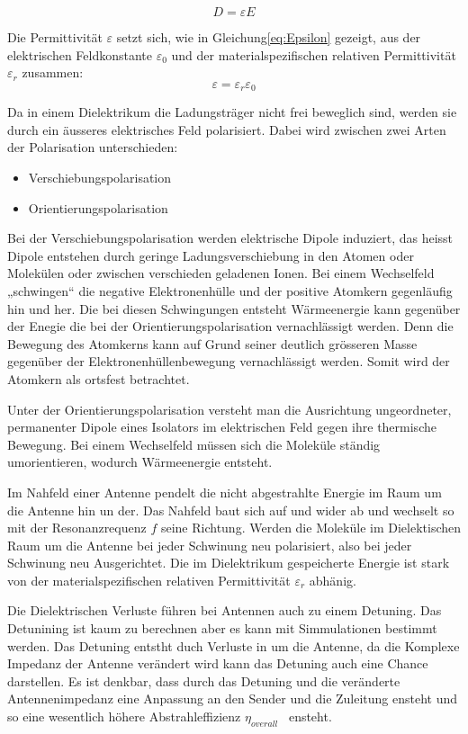 \begin{equation}\label{eq:FlussdichteD}
D=\varepsilon E
\end{equation}

Die Permittivität $\varepsilon$ setzt sich, wie in Gleichung\ref{eq:Epsilon} gezeigt, aus der elektrischen Feldkonstante $\varepsilon_0$ und der materialspezifischen relativen Permittivität $\varepsilon_r$ zusammen:
\begin{equation}\label{eq:Epsilon}
\varepsilon = \varepsilon_r \varepsilon_0
\end{equation}

Da in einem Dielektrikum die Ladungsträger nicht frei beweglich sind, werden sie durch ein äusseres elektrisches Feld polarisiert. Dabei wird zwischen zwei Arten der Polarisation unterschieden:
\begin{itemize}
\item Verschiebungspolarisation
\item Orientierungspolarisation
\end{itemize}
Bei der Verschiebungspolarisation werden elektrische Dipole  induziert, das heisst Dipole entstehen durch geringe Ladungsverschiebung in den Atomen oder Molekülen oder zwischen verschieden geladenen Ionen. Bei einem Wechselfeld „schwingen“ die negative Elektronenhülle und der positive Atomkern gegenläufig hin und her. Die bei diesen Schwingungen entsteht  Wärmeenergie kann gegenüber der Enegie die bei der Orientierungspolarisation vernachlässigt werden.  Denn die Bewegung des Atomkerns kann auf Grund seiner deutlich grösseren Masse  gegenüber der Elektronenhüllenbewegung vernachlässigt werden. Somit wird der Atomkern als ortsfest betrachtet. 

Unter der Orientierungspolarisation versteht man die Ausrichtung ungeordneter, permanenter Dipole eines Isolators im elektrischen Feld gegen ihre thermische Bewegung. Bei einem Wechselfeld müssen sich die Moleküle ständig umorientieren, wodurch Wärmeenergie entsteht.

Im Nahfeld einer Antenne pendelt die nicht abgestrahlte Energie im Raum um die Antenne hin un der. Das Nahfeld baut sich auf und wider ab und wechselt so mit der Resonanzrequenz $f$ seine Richtung. Werden die Moleküle im Dielektischen Raum um die Antenne bei jeder Schwinung neu polarisiert, also bei jeder Schwinung neu Ausgerichtet.
Die im Dielektrikum gespeicherte Energie ist stark von der materialspezifischen relativen Permittivität $\varepsilon_r $ abhänig. 

Die Dielektrischen Verluste führen bei Antennen auch zu einem Detuning. Das Detunining ist kaum zu berechnen aber es kann mit Simmulationen bestimmt werden. Das Detuning entstht duch Verluste in um die  Antenne, da die Komplexe Impedanz der Antenne verändert wird kann das Detuning auch eine Chance darstellen. Es ist denkbar, dass durch das Detuning und die veränderte Antennenimpedanz eine Anpassung an den Sender und die Zuleitung ensteht und so eine wesentlich höhere Abstrahleffizienz $\eta_{overall}$ \ ensteht.


